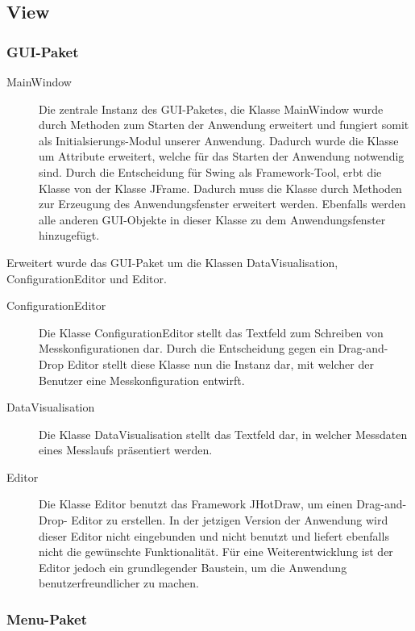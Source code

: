 \documentclass[parskip=full]{scrartcl}
\begin{document}
\subsection{View}


\subsubsection{GUI-Paket}

\begin{description}
\item[MainWindow] Die zentrale Instanz des GUI-Paketes, die Klasse MainWindow wurde durch Methoden zum Starten der Anwendung erweitert und fungiert somit als Initialsierungs-Modul unserer Anwendung. Dadurch wurde die Klasse um Attribute erweitert, welche für das Starten der Anwendung notwendig sind. Durch die Entscheidung für Swing als Framework-Tool, erbt die Klasse von der Klasse JFrame. Dadurch muss die Klasse durch Methoden zur Erzeugung des Anwendungsfenster erweitert werden. Ebenfalls werden alle anderen GUI-Objekte in dieser Klasse zu dem Anwendungsfenster hinzugefügt. 
\end{description}

Erweitert wurde das GUI-Paket um die Klassen DataVisualisation, ConfigurationEditor und Editor.

\begin{description}
\item[ConfigurationEditor] Die Klasse ConfigurationEditor stellt das Textfeld zum Schreiben von Messkonfigurationen dar. Durch die Entscheidung gegen ein Drag-and-Drop Editor stellt diese Klasse nun die Instanz dar, mit welcher der Benutzer eine Messkonfiguration entwirft.
\item[DataVisualisation] Die Klasse DataVisualisation stellt das Textfeld dar, in welcher Messdaten eines Messlaufs präsentiert werden.
\item[Editor] Die Klasse Editor benutzt das Framework JHotDraw, um einen Drag-and-Drop- Editor zu erstellen. In der jetzigen Version der Anwendung wird dieser Editor nicht eingebunden und nicht benutzt und liefert ebenfalls nicht die gewünschte Funktionalität. Für eine Weiterentwicklung ist der Editor jedoch ein grundlegender Baustein, um die Anwendung benutzerfreundlicher zu machen.
\end{description}

\subsubsection{Menu-Paket}
\end{document}
